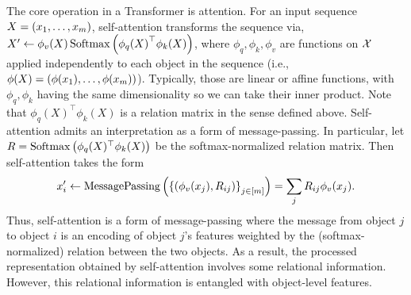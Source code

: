 The core operation in a Transformer is attention. For an input sequence $X = \left(x_1, \ldots, x_m\right)$, self-attention transforms the sequence via, $ X' \gets \phi_v(X) \, \mathrm{Softmax}\left({\phi_q(X)}^\top \phi_k(X)\right)$,
where $\phi_q, \phi_k, \phi_v$ are functions on ${\mathcal{X}}$ applied independently to each object in the sequence (i.e., $\phi(X) = \left(\phi(x_1), \ldots, \phi(x_m)\right)$). Typically, those are linear or affine functions, with $\phi_q, \phi_k$ having the same dimensionality so we can take their inner product. Note that $\phi_q(X)^\top \phi_k(X)$ is a relation matrix in the sense defined above. Self-attention admits an interpretation as a form of message-passing. In particular, let $R = \mathrm{Softmax}\left(\phi_q(X)^\top \phi_k(X)\right)$ be the softmax-normalized relation matrix. Then self-attention takes the form
\begin{equation}\label{eq:self_attn_message_passing}
    x_i' \gets \mathrm{MessagePassing}\left(\left\{(\phi_v(x_j), R_{ij})\right\}_{j \in [m]}\right) = \sum_{j} R_{ij} \phi_v(x_j).
\end{equation}
Thus, self-attention is a form of message-passing where the message from object $j$ to object $i$ is an encoding of object $j$'s features weighted by the (softmax-normalized) relation between the two objects. As a result, the processed representation obtained by self-attention involves some relational information. However, this relational information is entangled with object-level features.

